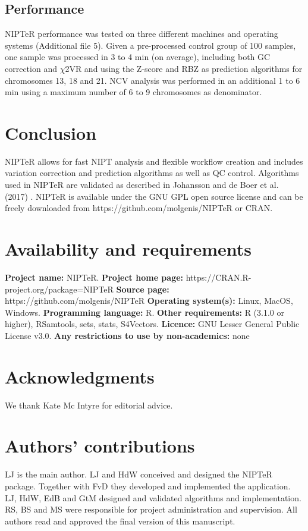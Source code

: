 \subsection{Performance}
NIPTeR performance was tested on three different machines and operating systems (Additional file 5). 
Given a pre-processed control group of 100 samples, one sample was processed in 3 to 4 min (on average), including both GC correction and $\chi$2VR and using the Z-score and RBZ as prediction algorithms for chromosomes 13, 18 and 21. 
NCV analysis was performed in an additional 1 to 6 min using a maximum number of 6 to 9 chromosomes as denominator.

\section{Conclusion}\label{Conclusion}
NIPTeR allows for fast NIPT analysis and flexible workflow creation and includes variation correction and prediction algorithms as well as QC control. 
Algorithms used in NIPTeR are validated as described in Johansson and de Boer et al. (2017) \cite{Johansson_2017}. 
NIPTeR is available under the GNU GPL open source license and can be freely downloaded from https://github.com/molgenis/NIPTeR or CRAN.

\section{Availability and requirements}
\textbf{Project name:} NIPTeR.
\textbf{Project home page:} https://CRAN.R-project.org/package=NIPTeR
\textbf{Source page:} https://github.com/molgenis/NIPTeR
\textbf{Operating system(s):} Linux, MacOS, Windows.
\textbf{Programming language:} R.
\textbf{Other requirements:} R (3.1.0 or higher), RSamtools, sets, stats, S4Vectors.
\textbf{Licence:} GNU Lesser General Public License v3.0.
\textbf{Any restrictions to use by non-academics:} none

\section*{Acknowledgments}\label{Acknowledgments} 
We thank Kate Mc Intyre for editorial advice.

\section*{Authors’ contributions}
LJ is the main author. 
LJ and HdW conceived and designed the NIPTeR package. 
Together with FvD they developed and implemented the application. 
LJ, HdW, EdB and GtM designed and validated algorithms and implementation. 
RS, BS and MS were responsible for project administration and supervision. 
All authors read and approved the final version of this manuscript.

